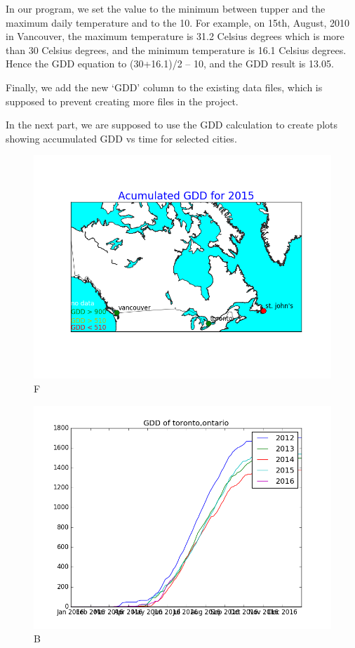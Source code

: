 \documentclass[12pt,letterpaper]{article}
\begin{document}
In our program, we set the  value to the minimum between tupper and the maximum daily temperature and  to the 10. For example, on 15th, August, 2010 in Vancouver, the maximum temperature is 31.2 Celsius degrees which is more than 30 Celsius degrees, and the minimum temperature is 16.1 Celsius degrees. Hence the GDD equation to (30+16.1)/2 – 10, and the GDD result is 13.05.

Finally, we add the new ‘GDD’ column to the existing data files, which is supposed to prevent creating more files in the project.

In the next part, we are supposed to use the GDD calculation to create plots showing accumulated GDD vs time for selected cities.
\begin{figure}
\centering
\includegraphics[scale=0.6]{GDDMap_2015.png}
\caption{F}
\end{figure}

\begin{figure}
\centering
\includegraphics[scale=0.6]{toronto,ontario_GddPlot.png}
\caption{B}
\label{fig:gbm}
\end{figure}
\end{document}
